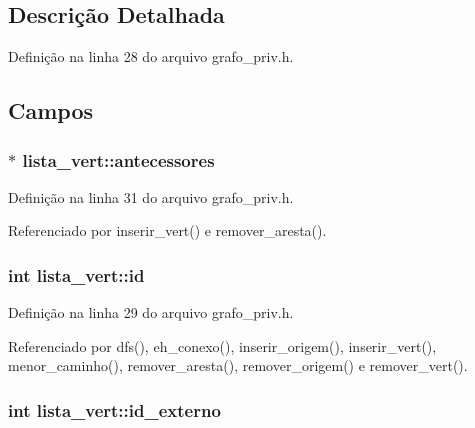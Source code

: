 \subsection{Descrição Detalhada}


Definição na linha 28 do arquivo grafo\+\_\+priv.\+h.



\subsection{Campos}
\hypertarget{structlista__vert_a39a423ac0ec49cb5bcca3c73c353db19}{}
\subsubsection[{antecessores}]{$\ast$ lista\+\_\+vert\+::antecessores}\label{structlista__vert_a39a423ac0ec49cb5bcca3c73c353db19}


Definição na linha 31 do arquivo grafo\+\_\+priv.\+h.



Referenciado por inserir\+\_\+vert() e remover\+\_\+aresta().

\hypertarget{structlista__vert_acce74c81e9c5ed24ff7bc175e22a7079}{}
\subsubsection[{id}]{\setlength{\rightskip}{0pt plus 5cm}int lista\+\_\+vert\+::id}\label{structlista__vert_acce74c81e9c5ed24ff7bc175e22a7079}


Definição na linha 29 do arquivo grafo\+\_\+priv.\+h.



Referenciado por dfs(), eh\+\_\+conexo(), inserir\+\_\+origem(), inserir\+\_\+vert(), menor\+\_\+caminho(), remover\+\_\+aresta(), remover\+\_\+origem() e remover\+\_\+vert().

\hypertarget{structlista__vert_a4741315d4db64dad0ee3b59d8f5a4951}{}
\subsubsection[{id\+\_\+externo}]{\setlength{\rightskip}{0pt plus 5cm}int lista\+\_\+vert\+::id\+\_\+externo}\label{structlista__vert_a4741315d4db64dad0ee3b59d8f5a4951}



